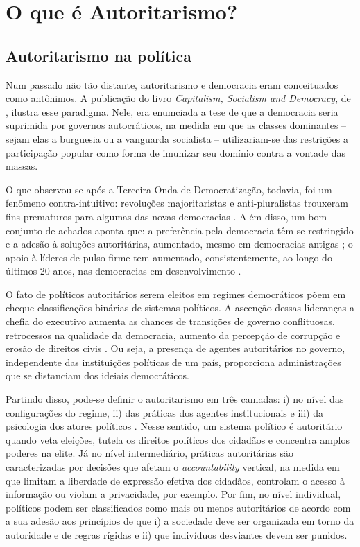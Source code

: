 \documentclass[
12pt,				%
openright,			%
twoside,			%
a4paper,			%
english,			%
french,				%
spanish,			%
brazil				%
]{abntex2}
\begin{document}
\chapter{O que é Autoritarismo?}\label{referencial_teorico}

\section{Autoritarismo na política}

Num passado não tão distante, autoritarismo e democracia eram conceituados como antônimos. A publicação do livro \emph{Capitalism, Socialism and Democracy}, de , ilustra esse paradigma. Nele, era enumciada a tese de que a democracia seria suprimida por governos autocráticos, na medida em que  as classes dominantes -- sejam elas a burguesia ou a vanguarda socialista -- utilizariam-se das restrições a participação popular como forma de imunizar seu domínio contra a vontade das massas. 

O que observou-se após a Terceira Onda de Democratização, todavia, foi um fenômeno contra-intuitivo: revoluções majoritaristas e anti-pluralistas trouxeram fins prematuros para algumas das novas democracias \cite{lipset1993reflections}. Além disso, um bom conjunto de achados aponta que: a preferência pela democracia têm se restringido e a adesão à soluções autoritárias, aumentado, mesmo em democracias antigas \cite{foa2016democratic, foa2017signs, foa2017end}; o apoio à líderes de pulso firme tem aumentado, consistentemente, ao longo do últimos 20 anos, nas democracias em desenvolvimento \cite{voeten2016people}.

O fato de políticos autoritários serem eleitos em regimes democráticos põem em cheque classificações binárias de sistemas políticos. A ascenção dessas lideranças a chefia do executivo aumenta as chances de transições de governo conflituosas, retrocessos na qualidade da democracia, aumento da percepção de corrupção e erosão de direitos civis \cite{mounk2018thepopulist}. Ou seja, a presença de agentes autoritários no governo, independente das instituições políticas de um país, proporciona administrações que se distanciam dos ideiais democráticos. 

Partindo disso, pode-se definir o autoritarismo em três camadas: i) no nível das configurações do regime, ii) das práticas dos agentes institucionais e iii) da psicologia dos atores políticos \cite{glasius2018authoritarianism}. Nesse sentido, um sistema político é autoritário quando veta eleições, tutela os direitos políticos dos cidadãos e concentra amplos poderes na elite. Já no nível intermediário, práticas autoritárias são caracterizadas por decisões que afetam o \emph{accountability} vertical, na medida em que limitam a liberdade de expressão efetiva dos cidadãos, controlam o acesso à informação ou violam a privacidade, por exemplo. Por fim, no nível individual, políticos podem ser classificados como mais ou menos autoritários de acordo com a sua adesão aos princípios de que i) a sociedade deve ser organizada em torno da autoridade e de regras rígidas e ii) que indivíduos desviantes devem ser punidos.
\end{document}
